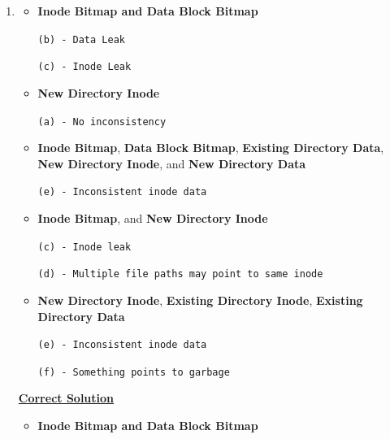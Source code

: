 \documentclass[12pt]{article}
\begin{document}
\begin{enumerate}[1.]
\begin{enumerate}
        \item

        \begin{itemize}
            \item \textbf{Inode Bitmap and Data Block Bitmap}

            \bigskip

            \texttt{(b) - Data Leak}

            \texttt{(c) - Inode Leak}

            \item \textbf{New Directory Inode}

            \bigskip

            \texttt{(a) - No inconsistency}

            \item \textbf{Inode Bitmap}, \textbf{Data Block Bitmap}, \textbf{Existing Directory Data},
            \textbf{New Directory Inode}, and \textbf{New Directory Data}

            \bigskip

            \texttt{(e) - Inconsistent inode data}

            \item \textbf{Inode Bitmap}, and \textbf{New Directory Inode}

            \bigskip

            \texttt{(c) - Inode leak}

            \texttt{(d) - Multiple file paths may point to same inode}

            \item \textbf{New Directory Inode}, \textbf{Existing Directory Inode}, \textbf{Existing Directory Data}

            \bigskip

            \texttt{(e) - Inconsistent inode data}

            \texttt{(f) - Something points to garbage}
        \end{itemize}

        \bigskip

        \begin{mdframed}
        \underline{\textbf{Correct Solution}}

        \bigskip

        \begin{itemize}
            \item \textbf{Inode Bitmap and Data Block Bitmap}


\end{itemize}
\end{mdframed}
\end{enumerate}
\end{enumerate}
\end{document}
